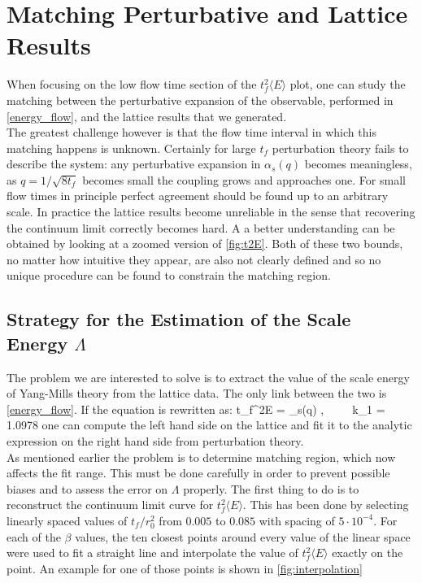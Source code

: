 \section{Matching Perturbative and Lattice Results}
When focusing on the low flow time section of the $t_f^2\langle E \rangle$ plot, one can study the matching between the perturbative expansion of the observable, performed in \cref{energy_flow}, and the lattice results that we generated. \\
The greatest challenge however is that the flow time interval in which this matching happens is unknown. Certainly for large $t_f$ perturbation theory fails to describe the system: any perturbative expansion in $\alpha_s(q)$ becomes meaningless, as $q=1/\sqrt{8t_f}$ becomes small the coupling grows and approaches one. For small flow times in principle perfect agreement should be found up to an arbitrary scale. In practice the lattice results become unreliable in the sense that recovering the continuum limit correctly becomes hard. A a better understanding can be obtained by looking at a zoomed version of \cref{fig:t2E}. Both of these two bounds, no matter how intuitive they appear, are also not clearly defined and so no unique procedure can be found to constrain the matching region.

\subsection{Strategy for the Estimation of the Scale Energy $\Lambda$}
The problem we are interested to solve is to extract the value of the scale energy of Yang-Mills theory from the lattice data. The only link between the two is \cref{energy_flow}. If the equation is rewritten as:
\beq
t_f^2\langle E \rangle =  \alpha_s(q) ,~~~~~k_1 = 1.0978%
\label{eq:t2Ebuona}
\eeq  
one can compute the left hand side on the lattice and fit it to the analytic expression on the right hand side from perturbation theory. \\
As mentioned earlier the problem is to determine matching region, which now affects the fit range. This must be done carefully in order to prevent possible biases and to assess the error on $\Lambda$ properly. The first thing to do is to reconstruct the continuum limit curve for $t_f^2\langle E \rangle$. This has been done by selecting linearly spaced values of $t_f/r_0^2$ from $0.005$ to $0.085$ with spacing of $5\cdot 10^{-4}$. For each of the $\beta$ values, the ten closest points around every value of the linear space were used to fit a straight line and interpolate the value of  $t_f^2\langle E \rangle$ exactly on the point. An example for one of those points is shown in \cref{fig:interpolation}
 
